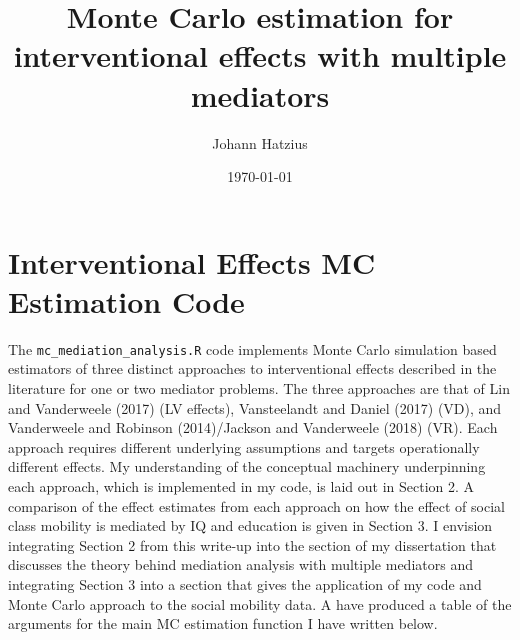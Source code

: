 \documentclass[12pt]{article} %
\title{Monte Carlo estimation for interventional effects with multiple mediators}
\author{Johann Hatzius}
\date{\today}
\numberwithin{equation}{section} %
\begin{document}
\maketitle

\section{Interventional Effects MC Estimation Code}

The \texttt{mc\_mediation\_analysis.R} code implements Monte Carlo simulation based estimators of
three distinct approaches to interventional effects described in the literature for one or two 
mediator problems. The three approaches are that of Lin and Vanderweele (2017) (LV effects), 
Vansteelandt and Daniel (2017) (VD), and Vanderweele and Robinson (2014)/Jackson and Vanderweele
(2018) (VR). Each approach requires different underlying assumptions and targets operationally 
different effects. My understanding of the conceptual machinery underpinning each approach, which
is implemented in my code, is laid out in Section 2. A comparison of the effect estimates from each
approach on how the effect of social class mobility is mediated by IQ and education is given in 
Section 3. I envision integrating Section 2 from this write-up into the section of my dissertation 
that discusses the theory behind mediation analysis with multiple mediators and integrating Section 3
into a section that gives the application of my code and Monte Carlo approach to the social mobility
data. A have produced a table of the arguments for the main MC estimation function I have written
below. 
\end{document}
